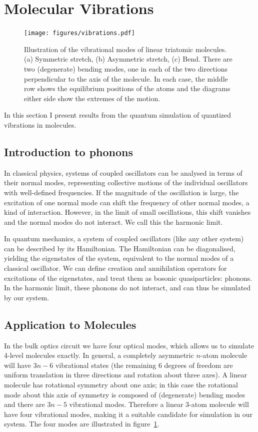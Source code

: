 \section{Molecular Vibrations}
\label{sec:Molecules}
\begin{figure}[h]
  \centering
  \texttt{[image: figures/vibrations.pdf]}
  \caption[Vibrational modes of linear triatomic molecules]
  {Illustration of the vibrational modes of linear triatomic molecules. (a)
  Symmetric stretch, (b) Asymmetric stretch, (c) Bend. There are two
  (degenerate) bending modes, one in each of the two directions perpendicular to
  the axis of the molecule. In each case, the middle row shows the equilibrium
  positions of the atoms and the diagrams either side show the extremes of the
  motion.}
  \label{fig:vibrations}
\end{figure}
In this section I present results from the quantum simulation of quantized
vibrations in molecules.

\subsection{Introduction to phonons}
\label{sec:Phonons}
In classical physics, systems of coupled oscillators can be analysed in terms of
their normal modes, representing collective motions of the individual
oscillators with well-defined frequencies. If the magnitude of the oscillation
is large, the excitation of one normal mode can shift the frequency of other
normal modes, a kind of interaction. However, in the limit of small
oscillations, this shift vanishes and the normal modes do not interact. We call
this the harmonic limit.

In quantum mechanics, a system of coupled oscillators (like any other system)
can be described by its Hamiltonian. The Hamiltonian can be diagonalised,
yielding the eigenstates of the system, equivalent to the normal modes of a
classical oscillator. We can define creation and annihilation operators for
excitations of the eigenstates, and treat them as bosonic quasiparticles:
phonons. In the harmonic limit, these phonons do not interact, and can thus be
simulated by our system.

\subsection{Application to Molecules}
In the bulk optics circuit we have four optical modes, which allows us to
simulate 4-level molecules
exactly. In general, a completely asymmetric \(n\)-atom molecule will have \(3
n-6\) vibrational states (the remaining 6 degrees of freedom are
uniform translation in three directions and rotation about three axes). A linear
molecule has rotational symmetry about one axis; in this case the rotational
mode about this axis of symmetry is composed of (degenerate) bending modes and
there are \(3n - 5\) vibrational modes. Therefore a linear 3-atom molecule will
have four vibrational modes, making it a suitable candidate for simulation in
our system. The four modes are illustrated in figure~\ref{fig:vibrations}.

